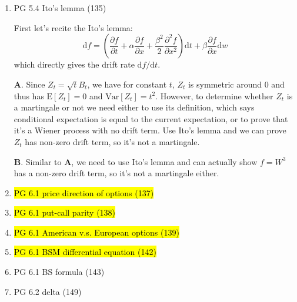 \documentclass[10pt]{article}
\newcommand{\E}{\text{E}}
\newcommand{\Var}{\text{Var}}
\renewcommand{\P}{\text{P}}
\renewcommand{\d}{\text{d}}
\newenvironment{note}{\begin{enumerate}[leftmargin=1em,topsep=0pt,noitemsep]}{\end{enumerate}}
\newcommand{\solution}{\boxed{\textbf{SOLUTION}}\hspace{.5em}}
\begin{document}
\begin{spacing}{1.1}
\begin{note}
      \textbf{C}. Assume the probability of hitting $3$ first is $\P_3$, then since $B_T$ is a martingale for $T$ being the first passage time, we know $3\P_3 + (-5)(1- \P_3)=0$ which gives $\P_3 = 5/8$. Generally, we have $\P_{\alpha}=\alpha/(\alpha + \beta)$. For $B_t=W_t+mt$, since $\exp(\lambda W_t + \lambda^2t/2)$ is a martingale (see exponential martingale), we know $X_t = \exp(\lambda B_t + \lambda^2t/2)$ is also a martingale and thus $\E[X_t]=0$. Notice this holds for any $\lambda$ and thus we can let $\lambda = -2m$, which gives $\E[X_t] = \E[\exp(-2mB_t)]=1$. We know a martingale stopped at the stopping time is also a martingale, i.e. $X_T$ is still a martingale for $T$ being the time first $B_t$ hits $3$ or $-5$, so $\E[X_T] = \E[\exp(-2mB_T)]=\P_3\exp(-2m\cdot 3) + (1-\P_3)\exp(2m\cdot 5) = \P_3\exp(-6m)+(1-\P_3)\exp(10m)=1$. Therefore, we have $\P_3 = \frac{\exp(10m)-1}{\exp(10m)-\exp(-6m)}$.

      \textbf{D}. Again we have $\E[\exp(-2mB_t)]=1$ while here we have $m=1$, and thus $\E[\exp(-2B_t)]=\P_{-1}\exp(2) + (1-\P_{-1})\exp(-\infty)=\exp(2)\P_{-2}=1$. So $\P_{-1}=\exp(-2)$.

\item PG 5.4 Ito's lemma (135) 
      
      \solution First let's recite the Ito's lemma:
      $$
      \d f = \left(\frac{\partial f}{\partial t} + \alpha \frac{\partial f}{\partial x} + \frac{\beta^2}{2}\frac{\partial^2 f}{\partial x^2}\right)\d t + \beta \frac{\partial f}{\partial x}\d w
      $$
      which directly gives the drift rate $\d f / \d t$.

      \textbf{A}. Since $Z_t  = \sqrt{t}B_t$, we have for constant $t$, $Z_t$ is symmetric around $0$ and thus has $\E[Z_t]=0$ and $\Var[Z_t]=t^2$. However, to determine whether $Z_t$ is a martingale or not we need either to use its definition, which says conditional expectation is equal to the current expectation, or to prove that it's a Wiener process with no drift term. Use Ito's lemma and we can prove $Z_t$ has non-zero drift term, so it's not a martingale.

      \textbf{B}. Similar to $\textbf{A}$, we need to use Ito's lemma and can actually show $f=W^3$ has a non-zero drift term, so it's not a martingale either.

\item \hl{PG 6.1 price direction of options (137)}
      
      

\item \hl{PG 6.1 put-call parity (138)}

\item \hl{PG 6.1 American v.s. European options (139)}

\item \hl{PG 6.1 BSM differential equation (142)}

\item PG 6.1 BS formula (143)

\item PG 6.2 delta (149)

\end{note}



\end{spacing}
\end{document}
